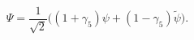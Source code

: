 \begin{equation}\label{Psi_Definition}
\Psi = \frac{1}{\sqrt{2}}\Big((1+\gamma_5)\psi+(1-\gamma_5)\tilde\psi\Big).
\end{equation}

